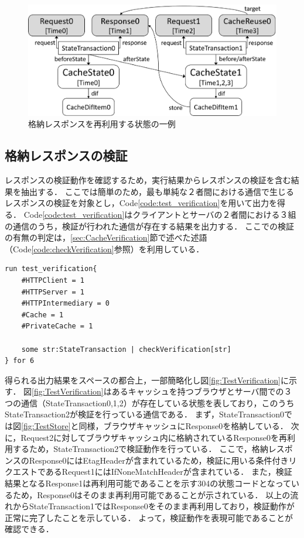 \documentclass[12pt,a4paper]{jbook}
\begin{document}
\begin{figure}[htb]
\centering
\includegraphics[width=450pt]{./fig/TestReuse.eps}
\caption{格納レスポンスを再利用する状態の一例}
\label{fig:TestReuse}
\end{figure}

\subsection{格納レスポンスの検証}
レスポンスの検証動作を確認するため，実行結果からレスポンスの検証を含む結果を抽出する．
ここでは簡単のため，最も単純な２者間における通信で生じるレスポンスの検証を対象とし，Code\ref{code:test_verification}を用いて出力を得る．
Code\ref{code:test_verification}はクライアントとサーバの２者間における３組の通信のうち，検証が行われた通信が存在する結果を出力する．
ここでの検証の有無の判定は，\ref{sec:CacheVerification}節で述べた述語（Code\ref{code:checkVerification}参照）を利用している．

\begin{lstlisting}[caption=格納レスポンスの検証, label=code:test_verification]
run test_verification{
	#HTTPClient = 1
	#HTTPServer = 1
	#HTTPIntermediary = 0
	#Cache = 1
	#PrivateCache = 1

	some str:StateTransaction | checkVerification[str]
} for 6
\end{lstlisting}

得られる出力結果をスペースの都合上，一部簡略化し図\ref{fig:TestVerification}に示す．
図\ref{fig:TestVerification}はあるキャッシュを持つブラウザとサーバ間での３つの通信（StateTransaction0,1,2）が存在している状態を表しており，このうちStateTransaction2が検証を行っている通信である．
まず，StateTransaction0では図\ref{fig:TestStore}と同様，ブラウザキャッシュにResponse0を格納している．
次に，Request2に対してブラウザキャッシュ内に格納されているResponse0を再利用するため，StateTransaction2で検証動作を行っている．
ここで，格納レスポンスのResponse0にはEtagHeaderが含まれているため，検証に用いる条件付きリクエストであるRequest1にはIfNoneMatchHeaderが含まれている．
また，検証結果となるResponse1は再利用可能であることを示す304の状態コードとなっているため，Response0はそのまま再利用可能であることが示されている．
以上の流れからStateTransaction1ではResponse0をそのまま再利用しており，検証動作が正常に完了したことを示している．
よって，検証動作を表現可能であることが確認できる．
\end{document}
